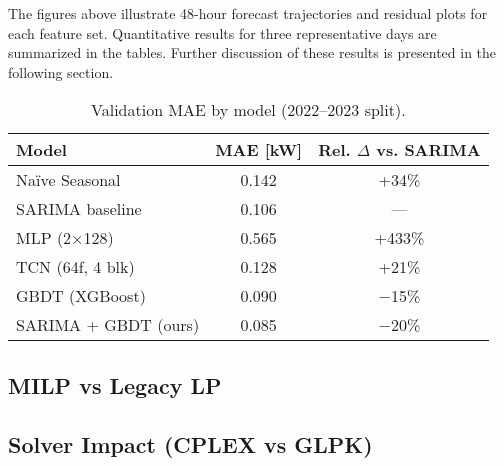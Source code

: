 
The figures above illustrate 48-hour forecast trajectories and residual plots for 
each feature set. Quantitative results for three representative days are summarized in 
the tables. Further discussion of these results is presented in the following section.












\begin{table}[h]
\centering
\caption{Validation MAE by model (2022–2023 split).}
\label{tab:model-comp}
\begin{tabular}{lcc}
\hline
Model & MAE [kW] & Rel. $\Delta$ vs. SARIMA \\
\hline
Naïve Seasonal      & 0.142 & +34\% \\
SARIMA baseline     & 0.106 & — \\
MLP (2×128)         & 0.565 & +433\% \\
TCN (64f, 4 blk)    & 0.128 & +21\% \\
GBDT (XGBoost)      & 0.090 & $-$15\% \\
SARIMA + GBDT (ours)& 0.085 & $-$20\% \\
\hline
\end{tabular}
\end{table}

\subsection{MILP vs Legacy LP}

\subsection{Solver Impact (CPLEX vs GLPK)}


